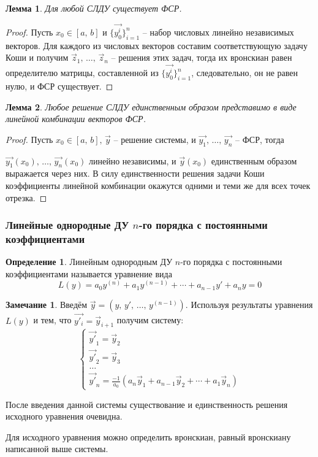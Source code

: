 \documentclass[a4paper,12pt]{article}
\theoremstyle{plain}
\newtheorem{lemma}{Лемма}[section]
\theoremstyle{definition}
\newtheorem{definition}{Определение}[section]
\newtheorem*{note}{Замечание}
\theoremstyle{remark}
\begin{document}
\begin{lemma}
	Для любой СЛДУ существует ФСР.
\end{lemma}

\begin{proof}
	Пусть $x_0 \in [a,\,b]$ и $\{\vec{y_0^i}\}_{i = 1}^n$ -- набор числовых линейно независимых векторов. Для каждого из числовых векторов составим соответствующую задачу Коши и получим $\vec{z}_1,\,\ldots,\,\vec{z}_n$ -- решения этих задач, тогда их вронскиан равен определителю матрицы, составленной из $\{\vec{y_0^i}\}_{i = 1}^n$, следовательно, он не равен нулю, и ФСР существует.
\end{proof}

\begin{lemma}
	Любое решение СЛДУ единственным образом представимо в виде линейной комбинации векторов ФСР.
\end{lemma}

\begin{proof}
	Пусть $x_0 \in [a,\,b],\, \vec{y}$ -- решение системы, и $\vec{y_1},\,\ldots,\,\vec{y_n}$ -- ФСР, тогда

	$\vec{y_1}(x_0),\,\ldots,\,\vec{y_n}(x_0)$ линейно независимы, и $\vec{y}(x_0)$ единственным образом выражается через них. В силу единственности решения задачи Коши коэффициенты линейной комбинации окажутся одними и теми же для всех точек отрезка.
\end{proof}

\subsubsection*{Линейные однородные ДУ $n$-го порядка с постоянными коэффициентами}
\begin{definition}
	Линейным однородным ДУ $n$-го порядка с постоянными коэффициентами называется уравнение вида
	\[L(y) = a_0y^{(n)} + a_1y^{(n - 1)} + \cdots + a_{n - 1}y' + a_ny = 0\]
\end{definition}

\begin{note}
	Введём $\vec{y} = (y,\, y',\,\ldots,\,y^{(n-1)})$. Используя результаты уравнения $L(y)$ и тем, что $\vec{y'_i} = \vec{y}_{i+1}$ получим систему:
	\[\begin{cases}
			\vec{y'}_1 = \vec{y}_2 \\
			\vec{y'}_2 = \vec{y}_3 \\
			\ldots                 \\
			\vec{y'}_n = \frac{-1}{a_0}(a_n\vec{y}_1 + a_{n-1}\vec{y}_2 + \cdots + a_1\vec{y}_n)
		\end{cases}\]

	После введения данной системы существование и единственность решения исходного уравнения очевидна.

	Для исходного уравнения можно определить вронскиан, равный вронскиану написанной выше системы.
\end{note}
\end{document}
